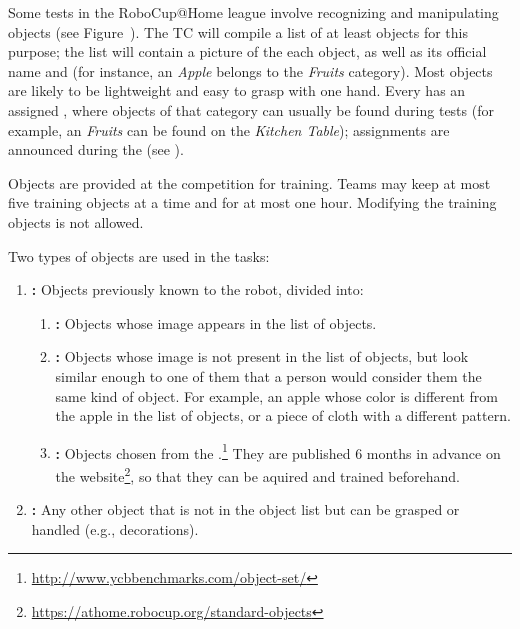 Some tests in the RoboCup@Home league involve recognizing and manipulating objects (see Figure~).
The TC will compile a list of at least \NumObjects objects for this purpose; the list will contain a picture of the each object, as well as its official name and \ObjectCategory{} (for instance, an \textit{Apple} belongs to the \textit{Fruits} category).
Most objects are likely to be lightweight and easy to grasp with one hand.
Every \ObjectCategory{} has an assigned \PredefinedLocation, where objects of that category can usually be found during tests (for example, an \textit{Fruits} can be found on the \textit{Kitchen Table}); assignments are announced during the \SetupDays{} (see \Organisation).

Objects are provided at the competition for training.
Teams may keep at most five training objects at a time and for at most one hour.
Modifying the training objects is not allowed.

Two types of objects are used in the tasks:
\begin{enumerate}
	\item \textbf{\KnownObjects{}:} Objects previously known to the robot, divided into:
	\begin{enumerate}
		\item \textbf{\ConsistentObjects{}:} Objects whose image appears in the list of objects.
		\item \textbf{\SimilarObjects{}:} Objects whose image is not present in the list of objects, but look similar enough to one of them that a person would consider them the same kind of object. For example, an apple whose color is different from the apple in the list of objects, or a piece of cloth with a different pattern.
		\item \textbf{\StandardObjects{}:} Objects chosen from the \YCBData{}.\footnote{\url{http://www.ycbbenchmarks.com/object-set/}} They are published 6 months in advance on the \RoboCup\AtHome{} website\footnote{\url{https://athome.robocup.org/standard-objects}}, so that they can be aquired and trained beforehand.
	\end{enumerate}
	\item \textbf{\UnknownObjects{}:} Any other object that is not in the object list but can be grasped or handled (e.g., \Arena{} decorations).
\end{enumerate}


